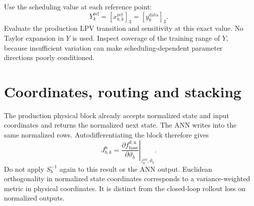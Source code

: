 \documentclass[11pt,a4paper]{article}
\begin{document}
Use the scheduling value at each reference point:
\begin{equation}
    Y_k^{\mathrm{ref}}
    =[x_{b,k}^{\mathrm{ref}}]_3=[y_k^{\mathrm{data}}]_3.
\end{equation}
Evaluate the production LPV transition and sensitivity at this exact value. No
Taylor expansion in \(Y\) is used. Inspect coverage of the training range of
\(Y\), because insufficient variation can make scheduling-dependent parameter
directions poorly conditioned.

\section{Coordinates, routing and stacking}

The production physical block already accepts normalized state and input
coordinates and returns the normalized next state. The ANN writes into the
same normalized rows. Autodifferentiating the block therefore gives
\begin{equation}
    J_{b,k}^{\mathrm n}
    =\left.
      \frac{\partial f_{\mathrm{base}}^{d,\mathrm n}}
      {\partial\vartheta_b}
      \right|_{z_k^{\mathrm{ref}},\bar\vartheta_b}.
    \label{eq:normalized-sensitivity}
\end{equation}
Do not apply \(S_b^{-1}\) again to this result or the ANN output. Euclidean
orthogonality in normalized state coordinates corresponds to a
variance-weighted metric in physical coordinates. It is distinct from the
closed-loop rollout loss on normalized outputs.
\end{document}

